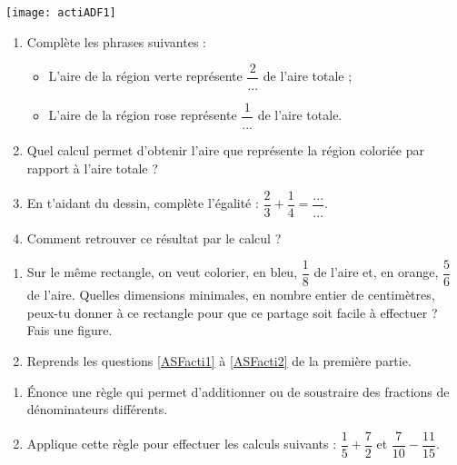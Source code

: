 \begin{activite}

\begin{partie}

\begin{center}
\texttt{[image: actiADF1]}
\end{center}

\begin{enumerate}
\item Complète les phrases suivantes :
    \begin{itemize}
        \item L'aire de la région verte représente $\dfrac{2}{...}$ de l'aire totale ;
        \item L'aire de la région rose représente $\dfrac{1}{...}$ de l'aire totale.
    \end{itemize}
\item \label{ASFacti1} Quel calcul permet d'obtenir l'aire que représente la région coloriée par rapport à l'aire totale ?
\item En t'aidant du dessin, complète l'égalité : $\dfrac{2}{3}+\dfrac{1}{4}=\dfrac{...}{...}$.
\item \label{ASFacti2} Comment retrouver ce résultat par le calcul ?
\end{enumerate}
\end{partie}

\begin{partie}
\begin{enumerate}
\item Sur le même rectangle, on veut colorier, en bleu, $\dfrac{1}{8}$ de l'aire et, en orange, $\dfrac{5}{6}$ de l'aire. Quelles dimensions minimales, en nombre entier de centimètres, peux-tu donner à ce rectangle pour que ce partage soit facile à effectuer ? Fais une figure.
\item Reprends les questions \ref{ASFacti1} à \ref{ASFacti2} de la première partie.
\end{enumerate}
\end{partie}

\begin{partie}
\begin{enumerate}
\item Énonce une règle qui permet d'additionner ou de soustraire des fractions de dénominateurs différents.
\item Applique cette règle pour effectuer les calculs suivants : $\dfrac{1}{5}+\dfrac{7}{2}$ et $\dfrac{7}{10}-\dfrac{11}{15}$.
\end{enumerate}
\end{partie}
\end{activite}





